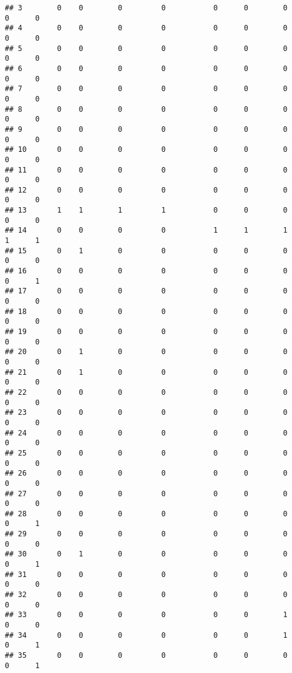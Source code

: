 \documentclass[
]{article}
\begin{document}
\begin{verbatim}
## 3        0    0        0         0           0      0        0     0      0
## 4        0    0        0         0           0      0        0     0      0
## 5        0    0        0         0           0      0        0     0      0
## 6        0    0        0         0           0      0        0     0      0
## 7        0    0        0         0           0      0        0     0      0
## 8        0    0        0         0           0      0        0     0      0
## 9        0    0        0         0           0      0        0     0      0
## 10       0    0        0         0           0      0        0     0      0
## 11       0    0        0         0           0      0        0     0      0
## 12       0    0        0         0           0      0        0     0      0
## 13       1    1        1         1           0      0        0     0      0
## 14       0    0        0         0           1      1        1     1      1
## 15       0    1        0         0           0      0        0     0      0
## 16       0    0        0         0           0      0        0     0      1
## 17       0    0        0         0           0      0        0     0      0
## 18       0    0        0         0           0      0        0     0      0
## 19       0    0        0         0           0      0        0     0      0
## 20       0    1        0         0           0      0        0     0      0
## 21       0    1        0         0           0      0        0     0      0
## 22       0    0        0         0           0      0        0     0      0
## 23       0    0        0         0           0      0        0     0      0
## 24       0    0        0         0           0      0        0     0      0
## 25       0    0        0         0           0      0        0     0      0
## 26       0    0        0         0           0      0        0     0      0
## 27       0    0        0         0           0      0        0     0      0
## 28       0    0        0         0           0      0        0     0      1
## 29       0    0        0         0           0      0        0     0      0
## 30       0    1        0         0           0      0        0     0      1
## 31       0    0        0         0           0      0        0     0      0
## 32       0    0        0         0           0      0        0     0      0
## 33       0    0        0         0           0      0        1     0      0
## 34       0    0        0         0           0      0        1     0      1
## 35       0    0        0         0           0      0        0     0      1

\end{verbatim}
\end{document}
